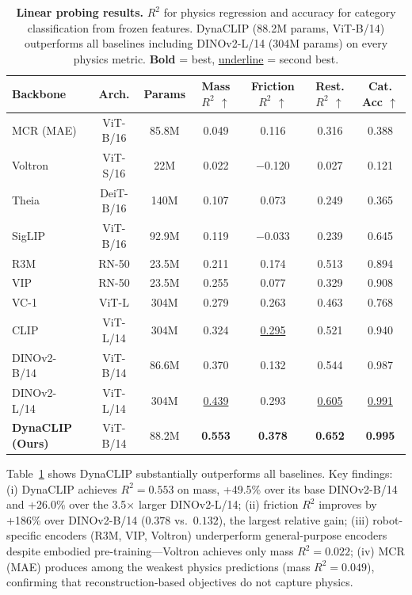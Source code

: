 \documentclass{article}
\newcommand{\methodname}{DynaCLIP}
\newcommand{\best}[1]{\textbf{#1}}
\newcommand{\second}[1]{\underline{#1}}
\begin{document}
\begin{table}[t]
\centering
\caption{\textbf{Linear probing results.} $R^2$ for physics regression and accuracy for category classification from frozen features. \methodname{} (88.2M params, ViT-B/14) outperforms all baselines including DINOv2-L/14 (304M params) on every physics metric. \best{Bold} = best, \second{underline} = second best.}
\label{tab:linear_probing}
\small
\begin{tabular}{@{}lcccccc@{}}
\toprule
\textbf{Backbone} & \textbf{Arch.} & \textbf{Params} & \textbf{Mass $R^2$ $\uparrow$} & \textbf{Friction $R^2$ $\uparrow$} & \textbf{Rest. $R^2$ $\uparrow$} & \textbf{Cat. Acc $\uparrow$} \\
\midrule
MCR (MAE)~\cite{he2022mae}  & ViT-B/16 & 85.8M & 0.049 & 0.116 & 0.316 & 0.388 \\
Voltron~\cite{karamcheti2023voltron} & ViT-S/16 & 22M & 0.022 & $-$0.120 & 0.027 & 0.121 \\
Theia~\cite{shang2024theia} & DeiT-B/16 & 140M & 0.107 & 0.073 & 0.249 & 0.365 \\
SigLIP~\cite{zhai2023siglip} & ViT-B/16 & 92.9M & 0.119 & $-$0.033 & 0.239 & 0.645 \\
R3M~\cite{nair2022r3m} & RN-50 & 23.5M & 0.211 & 0.174 & 0.513 & 0.894 \\
VIP~\cite{ma2022vip} & RN-50 & 23.5M & 0.255 & 0.077 & 0.329 & 0.908 \\
VC-1~\cite{radosavovic2023vc1} & ViT-L & 304M & 0.279 & 0.263 & 0.463 & 0.768 \\
CLIP~\cite{radford2021clip} & ViT-L/14 & 304M & 0.324 & \second{0.295} & 0.521 & 0.940 \\
DINOv2-B/14~\cite{oquab2024dinov2} & ViT-B/14 & 86.6M & 0.370 & 0.132 & 0.544 & 0.987 \\
DINOv2-L/14~\cite{oquab2024dinov2} & ViT-L/14 & 304M & \second{0.439} & 0.293 & \second{0.605} & \second{0.991} \\
\midrule
\textbf{\methodname{} (Ours)} & ViT-B/14 & 88.2M & \best{0.553} & \best{0.378} & \best{0.652} & \best{0.995} \\
\bottomrule
\end{tabular}
\vspace{-0.5em}
\end{table}

Table~\ref{tab:linear_probing} shows \methodname{} substantially outperforms all baselines. Key findings: (i) \methodname{} achieves $R^2{=}0.553$ on mass, +49.5\% over its base DINOv2-B/14 and +26.0\% over the 3.5$\times$ larger DINOv2-L/14; (ii) friction $R^2$ improves by +186\% over DINOv2-B/14 ($0.378$ vs.\ $0.132$), the largest relative gain; (iii) robot-specific encoders (R3M, VIP, Voltron) underperform general-purpose encoders despite embodied pre-training---Voltron achieves only mass $R^2{=}0.022$; (iv) MCR (MAE) produces among the weakest physics predictions (mass $R^2{=}0.049$), confirming that reconstruction-based objectives do not capture physics.
\end{document}
